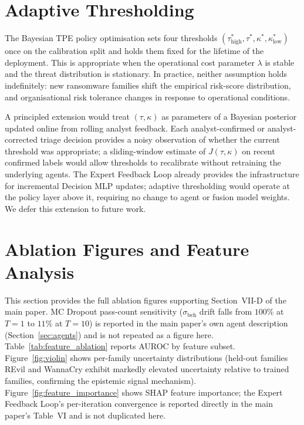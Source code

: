 \documentclass[journal]{IEEEtran}
\begin{document}
\section{Adaptive Thresholding}\label{sec:supp_adaptive}

The Bayesian TPE policy optimisation sets four thresholds
$(\tau_{\text{high}}^*, \tau^*, \kappa^*, \kappa_{\text{low}}^*)$ once on
the calibration split and holds them fixed for the lifetime of the deployment.
This is appropriate when the operational cost parameter $\lambda$ is stable
and the threat distribution is stationary.
In practice, neither assumption holds indefinitely: new ransomware families
shift the empirical risk-score distribution, and organisational risk tolerance
changes in response to operational conditions.

A principled extension would treat $(\tau, \kappa)$ as parameters of a
Bayesian posterior updated online from rolling analyst feedback.
Each analyst-confirmed or analyst-corrected triage decision provides a noisy
observation of whether the current threshold was appropriate; a
sliding-window estimate of $J(\tau, \kappa)$ on recent confirmed labels would
allow thresholds to recalibrate without retraining the underlying agents.
The Expert Feedback Loop already provides the infrastructure for incremental
Decision MLP updates; adaptive thresholding would operate at the policy layer
above it, requiring no change to agent or fusion model weights.
We defer this extension to future work.

\section{Ablation Figures and Feature Analysis}\label{sec:supp_ablation}

This section provides the full ablation figures supporting Section~VII-D of
the main paper. MC Dropout pass-count sensitivity ($\sigma_{\mathrm{beh}}$
drift falls from $100\%$ at $T{=}1$ to $11\%$ at $T{=}10$) is reported
in the main paper's own agent description
(Section~\ref{sec:agents}) and is not repeated as a figure here.
Table~\ref{tab:feature_ablation} reports AUROC by feature subset.
Figure~\ref{fig:violin} shows per-family uncertainty distributions
(held-out families REvil and WannaCry exhibit markedly elevated
uncertainty relative to trained families, confirming the epistemic
signal mechanism).
Figure~\ref{fig:feature_importance} shows SHAP feature importance; the
Expert Feedback Loop's per-iteration convergence is reported directly in
the main paper's Table~VI and is not duplicated here.
\end{document}
